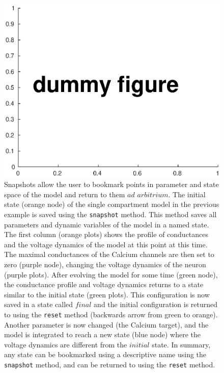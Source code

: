 \documentclass{frontiersSCNS} %
\begin{document}
\begin{figure}[!htb]
	\centering
	\includegraphics[width=1.0\linewidth]{gfx/figure_snapshot}
	\caption{Snapshots allow the user to bookmark points in parameter and state space of the model and return to them $ad$   $arbitrium$. The initial state (orange node) of the single compartment model in the previous example is saved using the \texttt{snapshot} method. This method saves all parameters and dynamic variables of the model in a named state. The first column (orange plots) shows the profile of conductances and the voltage dynamics of the model at this point at this time. The maximal conductances of the Calcium channels are then set to zero (purple node), changing the voltage dynamics of the neuron (purple plots). After evolving the model for some time (green node), the conductance profile and voltage dynamics returns to a state similar to the initial state (green plots). This configuration is now saved in a state called $final$ and the initial configuration is returned to using the \texttt{reset} method (backwards arrow from green to orange). Another parameter is now changed (the Calcium target), and the model is integrated to reach a new state (blue node) where the voltage dynamics are different from the $initial$ state. In summary, any state can be bookmarked using a descriptive name using the \texttt{snapshot} method, and can be returned to using the \texttt{reset} method.}
	\label{fig:figuresnapshot}
\end{figure}
\end{document}
